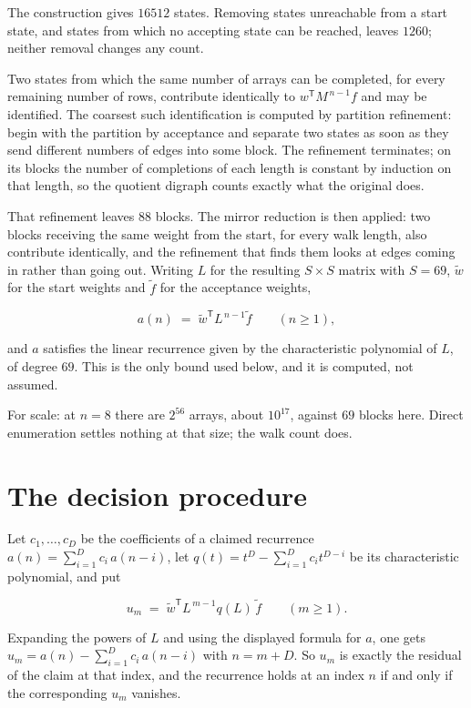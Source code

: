 \documentclass[11pt]{article}
\theoremstyle{definition}
\begin{document}
The construction gives $16512$ states. Removing states unreachable from a start state, and states from which no accepting state can be reached, leaves $1260$; neither removal changes any count.

Two states from which the same number of arrays can be completed, for every remaining number of rows, contribute identically to $w^{\mathsf T}M^{\,n-1}f$ and may be identified. The coarsest such identification is computed by partition refinement: begin with the partition by acceptance and separate two states as soon as they send different numbers of edges into some block. The refinement terminates; on its blocks the number of completions of each length is constant by induction on that length, so the quotient digraph counts exactly what the original does.

That refinement leaves $88$ blocks. The mirror reduction is then applied: two blocks receiving the same weight from the start, for every walk length, also contribute identically, and the refinement that finds them looks at edges coming in rather than going out. Writing $L$ for the resulting $S \times S$ matrix with $S = 69$, $\tilde w$ for the start weights and $\tilde f$ for the acceptance weights,

\[a(n) \;=\; \tilde w^{\mathsf T} L^{\,n-1} \tilde f \qquad (n \ge 1),\]

and $a$ satisfies the linear recurrence given by the characteristic polynomial of $L$, of degree $69$. This is the only bound used below, and it is computed, not assumed.

For scale: at $n = 8$ there are $2^{56}$ arrays, about $10^{17}$, against $69$ blocks here. Direct enumeration settles nothing at that size; the walk count does.

\section{The decision procedure}

Let $c_1,\dots,c_D$ be the coefficients of a claimed recurrence $a(n) = \sum_{i=1}^{D} c_i\,a(n-i)$, let $q(t) = t^{D} - \sum_{i=1}^{D} c_i t^{D-i}$ be its characteristic polynomial, and put

\[u_m \;=\; \tilde w^{\mathsf T} L^{\,m-1} q(L)\,\tilde f \qquad (m \ge 1).\]

Expanding the powers of $L$ and using the displayed formula for $a$, one gets $u_m = a(n) - \sum_{i=1}^{D} c_i\,a(n-i)$ with $n = m + D$. So $u_m$ is exactly the residual of the claim at that index, and the recurrence holds at an index $n$ if and only if the corresponding $u_m$ vanishes.
\end{document}
